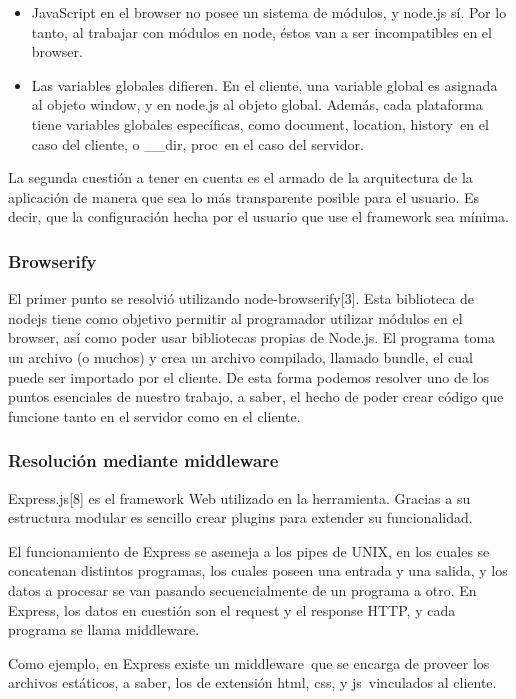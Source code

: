 \documentclass[doc,helv,longtable]{article}
\begin{document}
\begin{itemize}
\item  JavaScript en el browser no posee un sistema de módulos, y node.js sí. Por lo tanto, al trabajar con módulos en node, éstos van a ser incompatibles en el browser.  
\item  Las variables globales difieren. En el cliente, una variable global es asignada al objeto window, y en node.js al objeto global. Además, cada plataforma tiene variables globales específicas, como document, location, history en el caso del cliente, o \_\_dir, proc en el caso del servidor.

\end{itemize}


La segunda cuestión a tener en cuenta es el armado de la arquitectura de la aplicación de manera que sea lo más transparente posible para el usuario. Es decir, que la configuración hecha por el usuario que use el framework sea mínima.\subsubsection{Browserify}


El primer punto se resolvió utilizando node-browserify[3]. Esta biblioteca de nodejs tiene como objetivo permitir al programador utilizar módulos en el browser, así como poder usar bibliotecas propias de Node.js. El programa toma un archivo (o muchos) y crea un archivo compilado, llamado bundle, el cual puede ser importado por el cliente. De esta forma podemos resolver uno de los puntos esenciales de nuestro trabajo, a saber, el hecho de poder crear código que funcione tanto en el servidor como en el cliente.\subsubsection{Resolución mediante middleware}


Express.js[8] es el framework Web utilizado en la herramienta. Gracias a su estructura modular es sencillo crear plugins para extender su funcionalidad.

El funcionamiento de Express se asemeja a los pipes de UNIX, en los cuales se concatenan distintos programas, los cuales poseen una entrada y una salida, y los datos a procesar se van pasando secuencialmente de un programa a otro. En Express, los datos en cuestión son el request y el response HTTP, y cada programa se llama middleware.

Como ejemplo, en Express existe un middleware que se encarga de proveer los archivos estáticos, a saber, los de extensión html, css, y js vinculados al cliente.  
\end{document}
